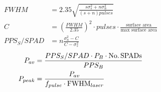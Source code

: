 \documentclass{article}
\begin{document}
\clearpage
\begin{align*}
FWHM &= 2.35\sqrt{\frac{s\sigma_s^2+n\sigma_n^2}{(s+n)pulses}}\\
C &= (\frac{FWHM}{2.35})^2\cdot pulses\cdot \frac{\text{surface area}}{\text{max surface area}}\\
PPS_S/SPAD &= n\frac{\sigma_n^2-C}{C-\sigma_s^2}
\end{align*}
\begin{align*}
P_{av} &= \frac{PPS_S/SPAD\cdot P_B\cdot\text{No.\,SPADs}}{PPS_B}\\
P_{peak} &= \frac{P_{av}}{f_{pulse}\cdot\text{FWHM}_{laser}}
\end{align*}
\begin{align*}
\end{align*}

\end{document}

